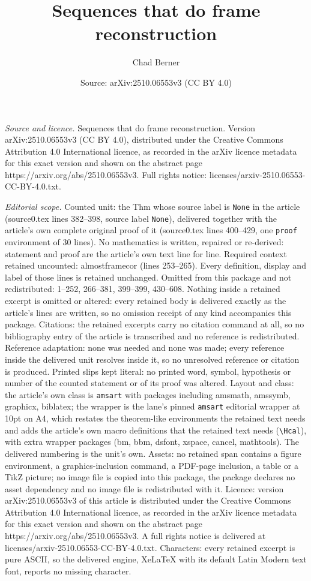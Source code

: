 \documentclass[10pt,a4paper]{amsart}
\title[Sequences that do frame reconstruction]{Sequences that do frame reconstruction}
\author{Chad Berner}
\date{Source: arXiv:2510.06553v3 (CC BY 4.0)}
\begin{document}
\maketitle

\noindent\emph{Source and licence.} Sequences that do frame reconstruction. Version arXiv:2510.06553v3 (CC BY 4.0), distributed under the Creative Commons Attribution 4.0 International licence, as recorded in the arXiv licence metadata for this exact version and shown on the abstract page https://arxiv.org/abs/2510.06553v3. Full rights notice: licenses/arxiv-2510.06553-CC-BY-4.0.txt.\par\smallskip

\noindent\textit{Editorial scope.} Counted unit: the Thm whose source label is \texttt{None} in the article (source0.tex lines 382--398, source label \texttt{None}), delivered together with the article's own complete original proof of it (source0.tex lines 400--429, one \texttt{proof} environment of 30 lines). No mathematics is written, repaired or re-derived: statement and proof are the article's own text line for line. Required context retained uncounted: almostframecor (lines 253--265). Every definition, display and label of those lines is retained unchanged. Omitted from this package and not redistributed: 1--252, 266--381, 399--399, 430--608. Nothing inside a retained excerpt is omitted or altered: every retained body is delivered exactly as the article's lines are written, so no omission receipt of any kind accompanies this package. Citations: the retained excerpts carry no citation command at all, so no bibliography entry of the article is transcribed and no reference is redistributed. Reference adaptation: none was needed and none was made; every reference inside the delivered unit resolves inside it, so no unresolved reference or citation is produced. Printed slips kept literal: no printed word, symbol, hypothesis or number of the counted statement or of its proof was altered. Layout and class: the article's own class is \texttt{amsart} with packages including amsmath, amssymb, graphicx, biblatex; the wrapper is the lane's pinned \texttt{amsart} editorial wrapper at 10pt on A4, which restates the theorem-like environments the retained text needs and adds the article's own macro definitions that the retained text needs (\texttt{\textbackslash Hcal}), with extra wrapper packages (bm, bbm, dsfont, xspace, cancel, mathtools). The delivered numbering is the unit's own. Assets: no retained span contains a figure environment, a graphics-inclusion command, a PDF-page inclusion, a table or a TikZ picture; no image file is copied into this package, the package declares no asset dependency and no image file is redistributed with it. Licence: version arXiv:2510.06553v3 of this article is distributed under the Creative Commons Attribution 4.0 International licence, as recorded in the arXiv licence metadata for this exact version and shown on the abstract page https://arxiv.org/abs/2510.06553v3. A full rights notice is delivered at licenses/arxiv-2510.06553-CC-BY-4.0.txt. Characters: every retained excerpt is pure ASCII, so the delivered engine, XeLaTeX with its default Latin Modern text font, reports no missing character.
\end{document}
